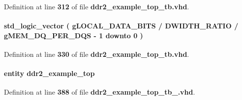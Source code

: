 Definition at line {\bf 312} of file {\bf ddr2\+\_\+example\+\_\+top\+\_\+tb.\+vhd}.

\paragraph[{dm\+\_\+delayed}]{ {\bfseries \textcolor{comment}{std\+\_\+logic\+\_\+vector}\textcolor{vhdlchar}{ }\textcolor{vhdlchar}{(}\textcolor{vhdlchar}{ }\textcolor{vhdlchar}{ }\textcolor{vhdlchar}{ }\textcolor{vhdlchar}{ }{\bfseries {\bf g\+L\+O\+C\+A\+L\+\_\+\+D\+A\+T\+A\+\_\+\+B\+I\+TS}} \textcolor{vhdlchar}{/}\textcolor{vhdlchar}{ }\textcolor{vhdlchar}{ }\textcolor{vhdlchar}{ }{\bfseries {\bf D\+W\+I\+D\+T\+H\+\_\+\+R\+A\+T\+IO}} \textcolor{vhdlchar}{/}\textcolor{vhdlchar}{ }\textcolor{vhdlchar}{ }\textcolor{vhdlchar}{ }{\bfseries {\bf g\+M\+E\+M\+\_\+\+D\+Q\+\_\+\+P\+E\+R\+\_\+\+D\+QS}} \textcolor{vhdlchar}{-\/}\textcolor{vhdlchar}{ } \textcolor{vhdldigit}{1} \textcolor{vhdlchar}{ }\textcolor{keywordflow}{downto}\textcolor{vhdlchar}{ }\textcolor{vhdlchar}{ } \textcolor{vhdldigit}{0} \textcolor{vhdlchar}{ }\textcolor{vhdlchar}{)}\textcolor{vhdlchar}{ }} \hspace{0.3cm}{\ttfamily [Signal]}}\label{classddr2__example__top__tb_1_1rtl_ae662ced3fde1a96e65558762c4ffc4bb}


Definition at line {\bf 330} of file {\bf ddr2\+\_\+example\+\_\+top\+\_\+tb.\+vhd}.

\paragraph[{dut}]{ {\bfseries \textcolor{keywordflow}{entity}\textcolor{vhdlchar}{ }\textcolor{vhdlchar}{ddr2\+\_\+example\+\_\+top}\textcolor{vhdlchar}{ }} \hspace{0.3cm}{\ttfamily [Instantiation]}}\label{classddr2__example__top__tb_1_1rtl_a623de4718fe48a8e036a1041bd516956}


Definition at line {\bf 388} of file {\bf ddr2\+\_\+example\+\_\+top\+\_\+tb\+\_.\+vhd}.


